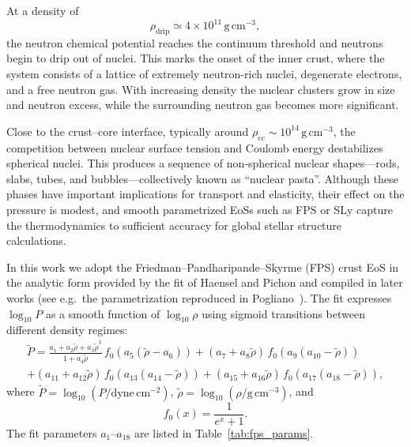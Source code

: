 At a density of
\[
  \rho_{\mathrm{drip}} \simeq 4\times 10^{11}\,\mathrm{g\,cm^{-3}},
\]
the neutron chemical potential reaches the continuum threshold and neutrons
begin to drip out of nuclei. This marks the onset of the inner crust,
where the system consists of a lattice of extremely neutron-rich nuclei,
degenerate electrons, and a free neutron gas. With increasing density the
nuclear clusters grow in size and neutron excess, while the surrounding
neutron gas becomes more significant.

Close to the crust--core interface, typically around
$\rho_{\mathrm{cc}}\sim 10^{14}\,\mathrm{g\,cm^{-3}}$, the competition between
nuclear surface tension and Coulomb energy destabilizes spherical nuclei.
This produces a sequence of non-spherical nuclear shapes—rods, slabs, tubes,
and bubbles—collectively known as ``nuclear pasta''. Although these phases
have important implications for transport and elasticity, their effect on the
pressure is modest, and smooth parametrized EoSs such as FPS or SLy capture
the thermodynamics to sufficient accuracy for global stellar structure
calculations.

In this work we adopt the Friedman–Pandharipande–Skyrme (FPS) crust EoS
in the analytic form provided by the fit of Haensel and Pichon and compiled
in later works (see e.g.\ the parametrization reproduced in
Pogliano~\cite{pogliano2017}).
The fit expresses $\log_{10}P$ as a smooth function of $\log_{10}\rho$ using
sigmoid transitions between different density regimes:
\begin{equation}
\begin{aligned}
\tilde{P} =
\frac{a_{1} + a_{2}\tilde{\rho} + a_{3}\tilde{\rho}^{3}}{
1 + a_{4}\tilde{\rho}}\, f_{0}\!\left(a_{5}(\tilde{\rho}-a_{6})\right)
+ (a_{7} + a_{8}\tilde{\rho}) \, f_{0}\!\left(a_{9}(a_{10}-\tilde{\rho})\right)\\
+ (a_{11} + a_{12}\tilde{\rho}) \, f_{0}\!\left(a_{13}(a_{14}-\tilde{\rho})\right)
+ (a_{15} + a_{16}\tilde{\rho}) \, f_{0}\!\left(a_{17}(a_{18}-\tilde{\rho})\right),
\label{eq:fps_fit}
\end{aligned}
\end{equation}
where $\tilde{P}=\log_{10}(P/\mathrm{dyne\,cm^{-2}})$,
$\tilde{\rho}=\log_{10}(\rho/\mathrm{g\,cm^{-3}})$, and
\begin{equation}
  f_{0}(x)=\frac{1}{e^{x}+1}.
\end{equation}
The fit parameters $a_{1}$–$a_{18}$ are listed in Table~\ref{tab:fps_params}.

